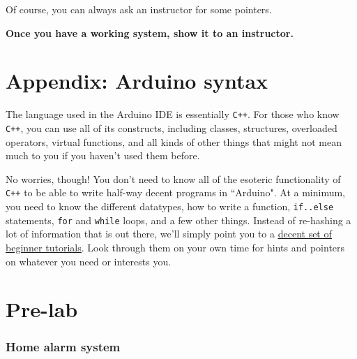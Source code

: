 \documentclass[11pt]{article} %
\begin{document}
\begin{enumerate}
Of course, you can always ask an instructor for some pointers.

\end{enumerate}

\textbf{Once you have a working system, show it to an instructor.}



\section*{Appendix: Arduino syntax}

The language used in the Arduino IDE is essentially \verb|C++|. For those who know \verb|C++|, you can use all of its constructs, including classes, structures, overloaded operators, virtual functions, and all kinds of other things that might not mean much to you if you haven't used them before.

No worries, though! You don't need to know all of the esoteric functionality of \verb|C++| to be able to write half-way decent programs in ``Arduino". At a minimum, you need to know the different datatypes, how to write a function, \verb|if..else| statements, \verb|for| and \verb|while| loops, and a few other things. Instead of re-hashing a lot of information that is out there, we'll simply point you to a \href{https://startingelectronics.org/software/arduino/learn-to-program-course/}{\underline{decent set of beginner tutorials}}. Look through them on your own time for hints and pointers on whatever you need or interests you.


\clearpage
\section*{Pre-lab}

\subsubsection*{Home alarm system}
\end{document}
